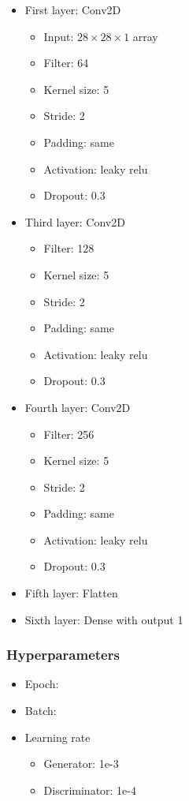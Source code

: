 \documentclass{article}
\begin{document}
\begin{itemize}
  \item First layer: Conv2D
    \begin{itemize}
      \item Input: $28 \times 28\times 1$ array
      \item Filter: 64
      \item Kernel size: 5
      \item Stride: 2
      \item Padding: same
      \item Activation: leaky relu
      \item Dropout: 0.3
  \end{itemize} 
  \item Third layer: Conv2D
    \begin{itemize}
      \item Filter: 128
      \item Kernel size: 5
      \item Stride: 2
      \item Padding: same
      \item Activation: leaky relu
      \item Dropout: 0.3
    \end{itemize}   
  \item Fourth layer: Conv2D
    \begin{itemize}
      \item Filter: 256
      \item Kernel size: 5
      \item Stride: 2
      \item Padding: same
      \item Activation: leaky relu
      \item Dropout: 0.3
    \end{itemize} 
  \item Fifth layer: Flatten
  \item Sixth layer: Dense with output 1
\end{itemize}

\subsubsection{Hyperparameters}

\begin{itemize}
  \item Epoch: 
  \item Batch: 
  \item Learning rate
    \begin{itemize}
      \item Generator: 1e-3
      \item Discriminator: 1e-4
    \end{itemize}
\end{itemize}
\end{document}
